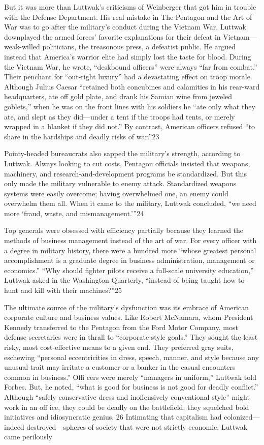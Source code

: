  \par 
But it was more than Luttwak’s criticisms of Weinberger that got him in trouble with the Defense Department. His real mistake in The Pentagon and the Art of War was to go after the military’s conduct during the Vietnam War. Luttwak downplayed the armed forces’ favorite explanations for their defeat in Vietnam—weak-willed politicians, the treasonous press, a defeatist public. He argued instead that America’s warrior elite had simply lost the taste for blood. During the Vietnam War, he wrote, “deskbound officers” were always “far from combat.” Their penchant for “out-right luxury” had a devastating effect on troop morale. Although Julius Caesar “retained both concubines and calamities in his rear-ward headquarters, ate off gold plate, and drank his Samian wine from jeweled goblets,” when he was on the front lines with his soldiers he “ate only what they ate, and slept as they did—under a tent if the troops had tents, or merely wrapped in a blanket if they did not.” By contrast, American officers refused “to share in the hardships and deadly risks of war.”{\color{blue}23}
 \par 
Pointy-headed bureaucrats also sapped the military’s strength, according to Luttwak. Always looking to cut costs, Pentagon officials insisted that weapons, machinery, and research-and-development programs be standardized. But this only made the military vulnerable to enemy attack. Standardized weapons systems were easily overcome; having overwhelmed one, an enemy could overwhelm them all. When it came to the military, Luttwak concluded, “we need more ‘fraud, waste, and mismanagement.’”{\color{blue}24}
 \par 
Top generals were obsessed with efficiency partially because they learned the methods of business management instead of the art of war. For every officer with a degree in military history, there were a hundred more “whose greatest personal accomplishment is a graduate degree in business administration, management or economics.” “Why should fighter pilots receive a full-scale university education,” Luttwak asked in the Washington Quarterly, “instead of being taught how to hunt and kill with their machines?”{\color{blue}25}
 \par 
The ultimate source of the military’s dysfunction was its embrace of American corporate culture and business values. Like Robert McNamara, whom President Kennedy transferred to the Pentagon from the Ford Motor Company, most defense secretaries were in thrall to “corporate-style goals.” They sought the least risky, most cost-effective means to a given end. They preferred gray suits, eschewing “personal eccentricities in dress, speech, manner, and style because any unusual trait may irritate a customer or a banker in the casual encounters common in business.” Offi cers were merely “managers in uniform,” Luttwak told Forbes. But, he noted, “what is good for business is not good for deadly conflict.” Although “safely conservative dress and inoffensively conventional style” might work in an off ice, they could be deadly on the battlefield; they squelched bold initiatives and idiosyncratic genius. {\color{blue}26} Intimating that capitalism had colonized—indeed destroyed—spheres of society that were not strictly economic, Luttwak came perilously
